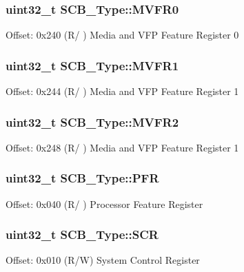 \subsubsection[{\texorpdfstring{M\+V\+F\+R0}{MVFR0}}]{ uint32\+\_\+t S\+C\+B\+\_\+\+Type\+::\+M\+V\+F\+R0}\hypertarget{struct_s_c_b___type_a658958c3e7cf9a0bb35c71853b2b6ea8}{}\label{struct_s_c_b___type_a658958c3e7cf9a0bb35c71853b2b6ea8}
Offset\+: 0x240 (R/ ) Media and V\+FP Feature Register 0 
\subsubsection[{\texorpdfstring{M\+V\+F\+R1}{MVFR1}}]{ uint32\+\_\+t S\+C\+B\+\_\+\+Type\+::\+M\+V\+F\+R1}\hypertarget{struct_s_c_b___type_a116ed13b1c1aba036b9307ed0ea55b47}{}\label{struct_s_c_b___type_a116ed13b1c1aba036b9307ed0ea55b47}
Offset\+: 0x244 (R/ ) Media and V\+FP Feature Register 1 
\subsubsection[{\texorpdfstring{M\+V\+F\+R2}{MVFR2}}]{ uint32\+\_\+t S\+C\+B\+\_\+\+Type\+::\+M\+V\+F\+R2}\hypertarget{struct_s_c_b___type_aed4b6e7df7dbef7bc468e6c857ef4204}{}\label{struct_s_c_b___type_aed4b6e7df7dbef7bc468e6c857ef4204}
Offset\+: 0x248 (R/ ) Media and V\+FP Feature Register 1 
\subsubsection[{\texorpdfstring{P\+FR}{PFR}}]{ uint32\+\_\+t S\+C\+B\+\_\+\+Type\+::\+P\+FR}\hypertarget{struct_s_c_b___type_aeb36c109d2fdb4eb4d6c4dc29154d77f}{}\label{struct_s_c_b___type_aeb36c109d2fdb4eb4d6c4dc29154d77f}
Offset\+: 0x040 (R/ ) Processor Feature Register 
\subsubsection[{\texorpdfstring{S\+CR}{SCR}}]{ uint32\+\_\+t S\+C\+B\+\_\+\+Type\+::\+S\+CR}\hypertarget{struct_s_c_b___type_abfad14e7b4534d73d329819625d77a16}{}\label{struct_s_c_b___type_abfad14e7b4534d73d329819625d77a16}
Offset\+: 0x010 (R/W) System Control Register 
